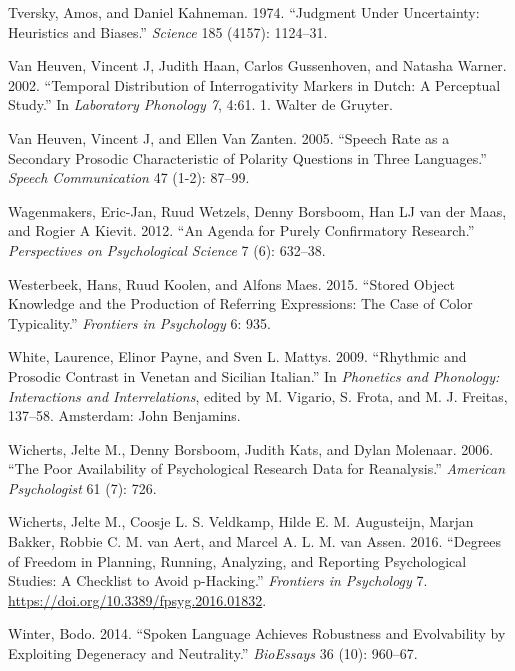 \documentclass[
  12pt,
]{article}
\newlength{\cslhangindent}
\newenvironment{CSLReferences}[2] %
 {%
  \setlength{\parindent}{0pt}
  \ifodd #1 \everypar{\setlength{\hangindent}{\cslhangindent}}\ignorespaces\fi
  \ifnum #2 > 0
  \setlength{\parskip}{#2\baselineskip}
  \fi
 }%
 {}
\begin{document}
\begin{CSLReferences}{1}{0}
\leavevmode{}%
Tversky, Amos, and Daniel Kahneman. 1974. {``Judgment Under Uncertainty: Heuristics and Biases.''} \emph{Science} 185 (4157): 1124--31.

\leavevmode{}%
Van Heuven, Vincent J, Judith Haan, Carlos Gussenhoven, and Natasha Warner. 2002. {``Temporal Distribution of Interrogativity Markers in {D}utch: A Perceptual Study.''} In \emph{Laboratory Phonology 7}, 4:61. 1. Walter de Gruyter.

\leavevmode{}%
Van Heuven, Vincent J, and Ellen Van Zanten. 2005. {``Speech Rate as a Secondary Prosodic Characteristic of Polarity Questions in Three Languages.''} \emph{Speech Communication} 47 (1-2): 87--99.

\leavevmode{}%
Wagenmakers, Eric-Jan, Ruud Wetzels, Denny Borsboom, Han LJ van der Maas, and Rogier A Kievit. 2012. {``An Agenda for Purely Confirmatory Research.''} \emph{Perspectives on Psychological Science} 7 (6): 632--38.

\leavevmode{}%
Westerbeek, Hans, Ruud Koolen, and Alfons Maes. 2015. {``Stored Object Knowledge and the Production of Referring Expressions: The Case of Color Typicality.''} \emph{Frontiers in Psychology} 6: 935.

\leavevmode{}%
White, Laurence, Elinor Payne, and Sven L. Mattys. 2009. {``Rhythmic and Prosodic Contrast in {V}enetan and {S}icilian {I}talian.''} In \emph{Phonetics and Phonology: Interactions and Interrelations}, edited by M. Vigario, S. Frota, and M. J. Freitas, 137--58. Amsterdam: John Benjamins.

\leavevmode{}%
Wicherts, Jelte M., Denny Borsboom, Judith Kats, and Dylan Molenaar. 2006. {``The Poor Availability of Psychological Research Data for Reanalysis.''} \emph{American Psychologist} 61 (7): 726.

\leavevmode{}%
Wicherts, Jelte M., Coosje L. S. Veldkamp, Hilde E. M. Augusteijn, Marjan Bakker, Robbie C. M. van Aert, and Marcel A. L. M. van Assen. 2016. {``Degrees of Freedom in Planning, Running, Analyzing, and Reporting Psychological Studies: A Checklist to Avoid p-Hacking.''} \emph{Frontiers in Psychology} 7. \url{https://doi.org/10.3389/fpsyg.2016.01832}.

\leavevmode{}%
Winter, Bodo. 2014. {``Spoken Language Achieves Robustness and Evolvability by Exploiting Degeneracy and Neutrality.''} \emph{BioEssays} 36 (10): 960--67.

\end{CSLReferences}

\endgroup
\end{document}
